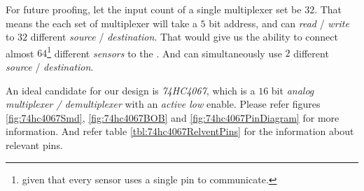 \documentclass[../../main]{subfiles}
\begin{document}

For future proofing, let the input count of a single multiplexer set be $32$. That means the
each set of multiplexer will take a $5$ bit address, and can \emph{read} / \emph{write} to
$32$ different \emph{source} / \emph{destination}. That would give us the ability to connect
almost $64$\footnote{given that every sensor uses a single pin to communicate.} different
\emph{sensors} to the \esp. And can simultaneously use $2$ different \emph{source} / \emph{destination}.

An ideal candidate for our design is \emph{74HC4067}, which is a $16$ bit
\emph{analog multiplexer / demultiplexer} with an \emph{active low} enable. Please refer figures
\ref{fig:74hc4067Smd}, \ref{fig:74hc4067BOB} and \ref{fig:74hc4067PinDiagram} for more information.
And refer table \ref{tbl:74hc4067RelventPins} for the information about relevant pins.
\end{document}
